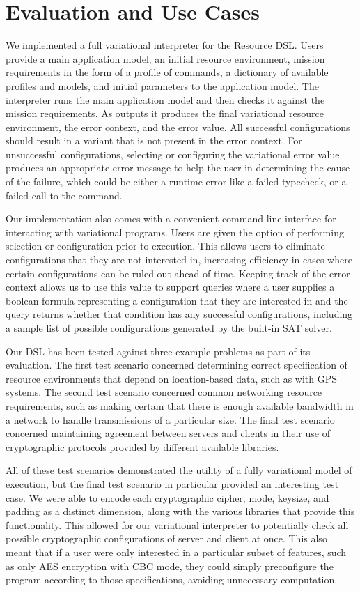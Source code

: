 \documentclass[12pt,oneside]{book}
\begin{document}
\section{Evaluation and Use Cases}

We implemented a full variational interpreter for the Resource DSL. Users provide a main application
model, an initial resource environment, mission requirements in the form of a profile of 
commands, a dictionary of available profiles and models, and initial parameters to the application model.
The interpreter runs the main application model and then checks it against the mission requirements. 
As outputs it produces the final variational resource environment, the error context, and the error value.
All successful configurations should result in a variant that is not present in the error context. For unsuccessful
configurations, selecting or configuring the variational error value produces an appropriate error message
to help the user in determining the cause of the failure, which could be either a runtime error like a failed
typecheck, or a failed call to the  command.

Our implementation also
comes with a convenient command-line interface for interacting with variational programs. Users
are given the option of performing selection or configuration prior to execution. This allows users to
eliminate configurations that they are not interested in, increasing efficiency in cases where certain
configurations can be ruled out ahead of time. Keeping track of the error context allows us to use this
value to support queries where a user supplies a boolean formula representing a configuration that they
are interested in and the query returns whether that condition has any successful configurations, including
a sample list of possible configurations generated by the built-in SAT solver.

Our DSL has been tested against three example problems as part of its evaluation. The first test scenario
concerned determining correct specification of resource environments that depend on location-based data,
such as with GPS systems. The second test scenario concerned common networking resource requirements,
such as making certain that there is enough available bandwidth in a network to handle transmissions of a particular
size. The final test scenario concerned maintaining agreement between servers and clients in their use of cryptographic
protocols provided by different available libraries.

All of these test scenarios demonstrated the utility of a fully variational model of execution, but the final test scenario in particular
provided an interesting test case. We were able to encode each cryptographic cipher, mode, keysize, and padding as a distinct
dimension, along with the various libraries that provide this functionality. This allowed for our variational interpreter to potentially check all possible
cryptographic configurations of server and client at once. This also meant that if a user were only interested in a particular subset of features, such as only AES
encryption with CBC mode, they could simply preconfigure the program according to those specifications, avoiding unnecessary
computation.
\end{document}
